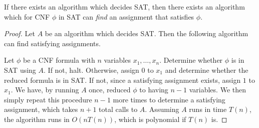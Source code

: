 \begin{thm}
    If there exists an algorithm which decides SAT, then there exists an algorithm which for CNF $\phi$ in SAT can \emph{find} an assignment that satisfies $\phi$.
\end{thm}

\begin{proof}
    Let $A$ be an algorithm which decides SAT. Then the following algorithm can find satisfying assignments.

    Let $\phi$ be a CNF formula with $n$ variables $x_1, \ldots, x_n$. Determine whether $\phi$ is in SAT using $A$. If not, halt. Otherwise, assign $0$ to $x_1$ and determine whether the reduced formula is in SAT. If not, since a satisfying assignment exists, assign $1$ to $x_1$. We have, by running $A$ once, reduced $\phi$ to having $n-1$ variables. We then simply repeat this procedure $n-1$ more times to determine a satisfying assignment, which takes $n+1$ total calls to $A$. Assuming $A$ runs in time $T(n)$, the algorithm runs in $O(nT(n))$, which is polynomial if $T(n)$ is.
\end{proof}
